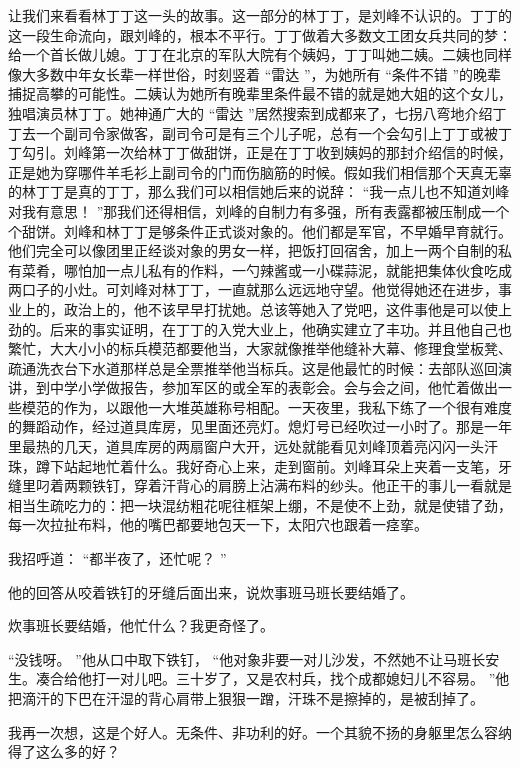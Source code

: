 \documentclass[12pt,twoside,openany]{book}
\begin{document}
让我们来看看林丁丁这一头的故事。这一部分的林丁丁，是刘峰不认识的。丁丁的这一段生命流向，跟刘峰的，根本不平行。丁丁做着大多数文工团女兵共同的梦：给一个首长做儿媳。丁丁在北京的军队大院有个姨妈，丁丁叫她二姨。二姨也同样像大多数中年女长辈一样世俗，时刻竖着 “雷达 ”，为她所有 “条件不错 ”的晚辈捕捉高攀的可能性。二姨认为她所有晚辈里条件最不错的就是她大姐的这个女儿，独唱演员林丁丁。她神通广大的 “雷达 ”居然搜索到成都来了，七拐八弯地介绍丁丁去一个副司令家做客，副司令可是有三个儿子呢，总有一个会勾引上丁丁或被丁丁勾引。刘峰第一次给林丁丁做甜饼，正是在丁丁收到姨妈的那封介绍信的时候，正是她为穿哪件羊毛衫上副司令的门而伤脑筋的时候。假如我们相信那个天真无辜的林丁丁是真的丁丁，那么我们可以相信她后来的说辞： “我一点儿也不知道刘峰对我有意思！ ”那我们还得相信，刘峰的自制力有多强，所有表露都被压制成一个个甜饼。刘峰和林丁丁是够条件正式谈对象的。他们都是军官，不早婚早育就行。他们完全可以像团里正经谈对象的男女一样，把饭打回宿舍，加上一两个自制的私有菜肴，哪怕加一点儿私有的作料，一勺辣酱或一小碟蒜泥，就能把集体伙食吃成两口子的小灶。可刘峰对林丁丁，一直就那么远远地守望。他觉得她还在进步，事业上的，政治上的，他不该早早打扰她。总该等她入了党吧，这件事他是可以使上劲的。后来的事实证明，在丁丁的入党大业上，他确实建立了丰功。并且他自己也繁忙，大大小小的标兵模范都要他当，大家就像推举他缝补大幕、修理食堂板凳、疏通洗衣台下水道那样总是全票推举他当标兵。这是他最忙的时候：去部队巡回演讲，到中学小学做报告，参加军区的或全军的表彰会。会与会之间，他忙着做出一些模范的作为，以跟他一大堆英雄称号相配。一天夜里，我私下练了一个很有难度的舞蹈动作，经过道具库房，见里面还亮灯。熄灯号已经吹过一小时了。那是一年里最热的几天，道具库房的两扇窗户大开，远处就能看见刘峰顶着亮闪闪一头汗珠，蹲下站起地忙着什么。我好奇心上来，走到窗前。刘峰耳朵上夹着一支笔，牙缝里叼着两颗铁钉，穿着汗背心的肩膀上沾满布料的纱头。他正干的事儿一看就是相当生疏吃力的：把一块混纺粗花呢往框架上绷，不是使不上劲，就是使错了劲，每一次拉扯布料，他的嘴巴都要地包天一下，太阳穴也跟着一痉挛。

我招呼道： “都半夜了，还忙呢？ ”

他的回答从咬着铁钉的牙缝后面出来，说炊事班马班长要结婚了。

炊事班长要结婚，他忙什么？我更奇怪了。

“没钱呀。 ”他从口中取下铁钉， “他对象非要一对儿沙发，不然她不让马班长安生。凑合给他打一对儿吧。三十岁了，又是农村兵，找个成都媳妇儿不容易。 ”他把滴汗的下巴在汗湿的背心肩带上狠狠一蹭，汗珠不是擦掉的，是被刮掉了。

我再一次想，这是个好人。无条件、非功利的好。一个其貌不扬的身躯里怎么容纳得了这么多的好？
\end{document}

